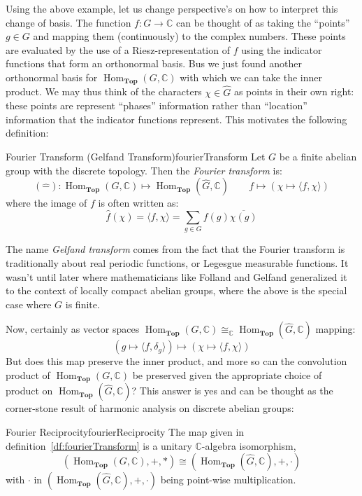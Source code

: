\documentclass{article}
\newcommand{\C}{{\mathbb{C}}}
\newcommand{\Top}{{\textbf{Top}}}
\newcommand{\Hom}{{\operatorname{Hom}}}
\begin{document}
Using the above example, let us change perspective's on how to interpret this change of basis. The
function $f: G \to \C$ can be thought of as taking the ``points'' $g \in G$ and mapping them (continuously) to
the complex numbers. These points are evaluated by the use of a Riesz-representation of $f$ using the
indicator functions that form an orthonormal basis. Bus we just found another orthonormal basis for $\Hom_\Top(G,
\C)$ with which we can take the inner product. We may thus think of the characters $\chi \in \hat{G}$ as
points in their own right: these points are represent ``phases'' information rather than ``location''
information that the indicator functions represent. This motivates the following definition:


\begin{defn}{Fourier Transform (Gelfand Transform)}{fourierTransform}
	Let $G$ be a finite abelian group with the discrete topology. Then the \emph{Fourier transform} is:
	\[
		(\widehat{-}): \Hom_\Top(G, \C) \mapsto \Hom_\Top(\hat{G}, \C) \qquad f \mapsto (\chi \mapsto \langle
		f, \chi\rangle)
	\]
	where the image of $f$ is often written as:
	\[
		\hat{f}(\chi) = \langle f, \chi \rangle = \sum_{g\in G} f(g)\overline{\chi(g)}
	\]
\end{defn}

The name \emph{Gelfand transform} comes from the fact that the Fourier transform is traditionally about real
periodic functions, or Legesgue measurable functions. It wasn't until later where mathematicians like Folland
and Gelfand generalized it to the context of locally compact abelian groups, where the above is the special
case where $G$ is finite.

Now, certainly as vector spaces $\Hom_\Top(G, \C)\cong_\C \Hom_\Top(\hat{G}, \C)$ mapping:
\[
  (g \mapsto \langle f, \delta_g \rangle) \mapsto (\chi \mapsto \langle f, \chi \rangle)
\]
But does this map preserve the inner product, and more so can the convolution product of $\Hom_\Top(G, \C)$ be
preserved given the appropriate choice of product on $\Hom_\Top(\hat{G}, \C)$? This answer is yes and can be
thought as the corner-stone result of harmonic analysis on discrete abelian groups:

\begin{thm}{Fourier Reciprocity}{fourierReciprocity}
	The map given in definition~\ref{df:fourierTransform} is a unitary $\C$-algebra isomorphism,
  \[
    (\Hom_\Top(G, \C), +, *) \cong (\Hom_\Top(\hat{G}, \C), +, \cdot)
  \]
  with $\cdot$ in $(\Hom_\Top(\hat{G}, \C), +, \cdot)$ being point-wise multiplication.
\end{thm}
\end{document}

